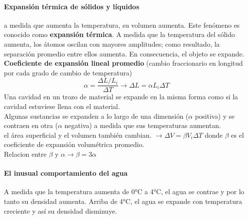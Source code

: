 \documentclass[10pt]{article}
\begin{document}
\paragraph{Expansión térmica de sólidos y líquidos}
 a medida que aumenta la temperatura, su volumen aumenta. Este fenómeno es conocido como \textbf{expansión térmica}. A medida
que la temperatura del sólido aumenta, los átomos oscilan con mayores amplitudes; como resultado, la separación promedio entre ellos aumenta.  En consecuencia, el objeto se expande.\\
\linebreak
\textbf{Coeficiente de expansión lineal promedio} (cambio fraccionario en longitud por cada grado de cambio de temperatura)
\begin{equation*}
	\alpha = \dfrac{\Delta L / L_i}{\Delta T} \rightarrow \Delta L = \alpha L_i \Delta T
\end{equation*}
Una cavidad en un trozo de material se expande en la misma forma
como si la cavidad estuviese llena con el material.\\
\linebreak
Algunas sustancias  se expanden a lo largo de una dimensión ($\alpha$ positiva) y se
contraen en otra ($\alpha$ negativa) a medida que sus temperaturas aumentan.\\
\linebreak
el área superficial y el volumen también cambian. $\rightarrow \Delta V = \beta V_i \Delta T$ donde $\beta$ es el  coeficiente de expansión volumétrica promedio.\\
Relacion entre $\beta \text{ y } \alpha \rightarrow \beta = 3\alpha$

\paragraph{El inusual comportamiento del agua}
 A medida que la temperatura aumenta
de 0°C a 4°C, el agua se contrae y por lo tanto su densidad aumenta. Arriba de 4°C, el agua
se expande con temperatura creciente y así su densidad disminuye.
\end{document}
